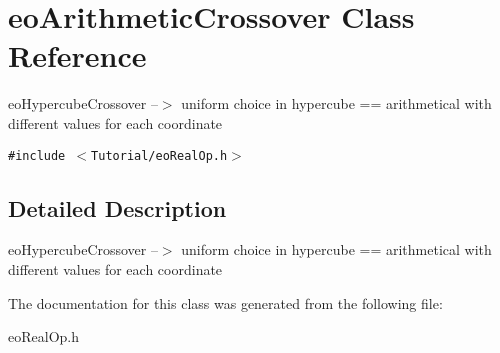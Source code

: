 \section{eo\-Arithmetic\-Crossover Class Reference}
\label{classeo_arithmetic_crossover}
eo\-Hypercube\-Crossover --$>$ uniform choice in hypercube == arithmetical with different values for each coordinate  


{\tt \#include $<$Tutorial/eo\-Real\-Op.h$>$}



\subsection{Detailed Description}
eo\-Hypercube\-Crossover --$>$ uniform choice in hypercube == arithmetical with different values for each coordinate 



The documentation for this class was generated from the following file:\begin{CompactItemize}
\item 
eo\-Real\-Op.h\end{CompactItemize}
